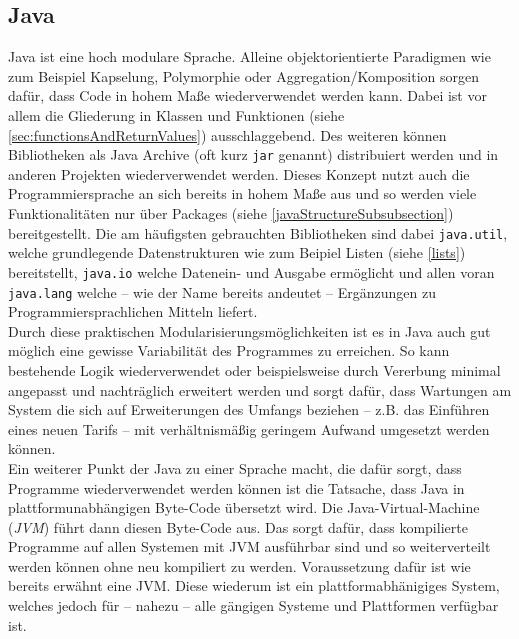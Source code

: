 \subsection*{Java}
Java ist eine hoch modulare Sprache. Alleine objektorientierte Paradigmen wie zum Beispiel Kapselung, Polymorphie oder Aggregation/Komposition sorgen dafür, dass Code in hohem Maße wiederverwendet werden kann. Dabei ist vor allem die Gliederung in Klassen und Funktionen (siehe \autoref{sec:functionsAndReturnValues}) ausschlaggebend. Des weiteren können Bibliotheken als Java Archive (oft kurz \texttt{jar} genannt) dis­tri­bu­ie­rt werden und in anderen Projekten wiederverwendet werden. Dieses Konzept nutzt auch die Programmiersprache an sich bereits in hohem Maße aus und so werden viele Funktionalitäten nur über Packages (siehe \autoref{javaStructureSubsubsection}) bereitgestellt. Die am häufigsten gebrauchten Bibliotheken sind dabei \texttt{java.util}, welche grundlegende Datenstrukturen wie zum Beipiel Listen (siehe \autoref{lists}) bereitstellt, \texttt{java.io} welche Datenein- und Ausgabe ermöglicht und allen voran \texttt{java.lang} welche -- wie der Name bereits andeutet -- Ergänzungen zu Programmiersprachlichen Mitteln liefert. 
\\
Durch diese praktischen Modularisierungsmöglichkeiten ist es in Java auch gut möglich eine gewisse Variabilität des Programmes zu erreichen. So kann bestehende Logik wiederverwendet oder beispielsweise durch Vererbung minimal angepasst und nachträglich erweitert werden und sorgt dafür, dass Wartungen am System die sich auf Erweiterungen des Umfangs beziehen -- z.B. das Einführen eines neuen Tarifs -- mit verhältnismäßig geringem Aufwand umgesetzt werden können.
\\
Ein weiterer Punkt der Java zu einer Sprache macht, die dafür sorgt, dass Programme wiederverwendet werden können ist die Tatsache, dass Java in plattformunabhängigen Byte-Code übersetzt wird. Die Java-Virtual-Machine (\textit{JVM}) führt dann diesen Byte-Code aus. Das sorgt dafür, dass kompilierte Programme auf allen Systemen mit JVM ausführbar sind und so weiterverteilt werden können ohne neu kompiliert zu werden. Voraussetzung dafür ist wie bereits erwähnt eine JVM. Diese wiederum ist ein plattformabhänigiges System, welches jedoch für -- nahezu -- alle gängigen Systeme und Plattformen verfügbar ist.

